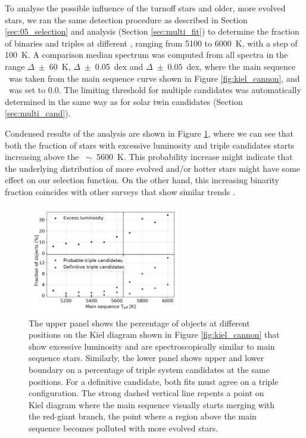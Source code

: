 To analyse the possible influence of the turnoff stars and older, more evolved stars, we ran the same detection procedure as described in Section \ref{sec:05_selection} and analysis (Section \ref{sec:multi_fit}) to determine the fraction of binaries and triples at different \Teff, ranging from 5100 to 6000~K, with a step of 100~K. A comparison median spectrum was computed from all spectra in the range $\Delta$\Teff~$\pm$~60~K, $\Delta$\Logg~$\pm$~0.05~dex and $\Delta$\Feh~$\pm $~$0.05$~dex, where the main sequence \Logg\ was taken from the main sequence curve shown in Figure \ref{fig:kiel_cannon}, and \Feh\ was set to $0.0$. The limiting threshold for multiple candidates was automatically determined in the same way as for solar twin candidates (Section \ref{sec:multi_cand}).

Condensed results of the analysis are shown in Figure \ref{fig:triple_hr}, where we can see that both the fraction of stars with excessive luminosity and triple candidates starts increasing above the \Teff~$\sim$~5600~K. This probability increase might indicate that the underlying distribution of more evolved and/or hotter stars might have some effect on our selection function. On the other hand, this increasing binarity fraction coincides with other surveys that show similar trends \cite{2013ARA&A..51..269D}.

\begin{figure}
	\centering
	\includegraphics[width=0.6\textwidth]{teff_triple_dist.png}
	\caption{The upper panel shows the percentage of objects at different positions on the Kiel diagram shown in Figure \ref{fig:kiel_cannon} that show excessive luminosity and are spectroscopically similar to main sequence stars. Similarly, the lower panel shows upper and lower boundary on a percentage of triple system candidates at the same positions. For a definitive candidate, both fits must agree on a triple configuration. The strong dashed vertical line repents a point on Kiel diagram where the main sequence visually starts merging with the red-giant branch, the point where a region above the main sequence becomes polluted with more evolved stars.}
	\label{fig:triple_hr}
\end{figure}

